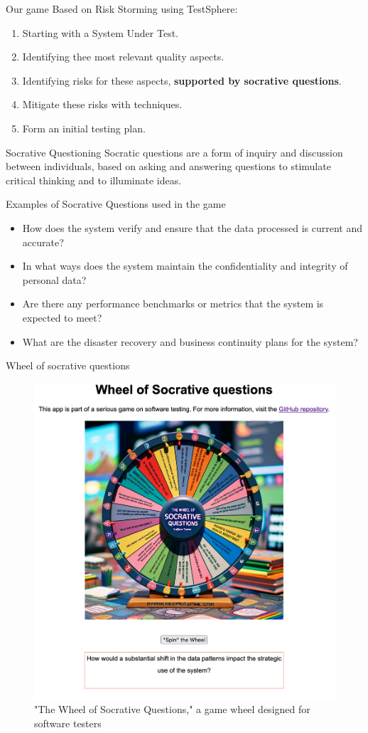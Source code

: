 \documentclass[aspectratio=169]{beamer}
\begin{document}
\begin{frame}{Our game}
    Based on Risk Storming using TestSphere:
    \begin{enumerate}
        \item Starting with a System Under Test.
        \item Identifying thee most relevant quality aspects.
        \item Identifying risks for these aspects, \textbf{supported by socrative questions}.
        \item Mitigate these risks with techniques.
        \item Form an initial testing plan.
    \end{enumerate}
\end{frame}

\begin{frame}{Socrative Questioning}
    Socratic questions are a form of inquiry and discussion between individuals, based on asking and answering questions to stimulate critical thinking and to illuminate ideas.
\end{frame}

\begin{frame}{Examples of Socrative Questions used in the game}
    \begin{itemize}
        \item How does the system verify and ensure that the data processed is current and accurate?
        \item In what ways does the system maintain the confidentiality and integrity of personal data?
        \item Are there any performance benchmarks or metrics that the system is expected to meet?
        \item What are the disaster recovery and business continuity plans for the system?
    \end{itemize}
\end{frame}

\begin{frame}{Wheel of socrative questions}
    \begin{figure}
        \centering
        \includegraphics[width=0.5\linewidth]{images//wheel}
        \caption{"The Wheel of Socrative Questions," a game wheel designed for software testers}
    \end{figure}
\end{frame}
\end{document}
